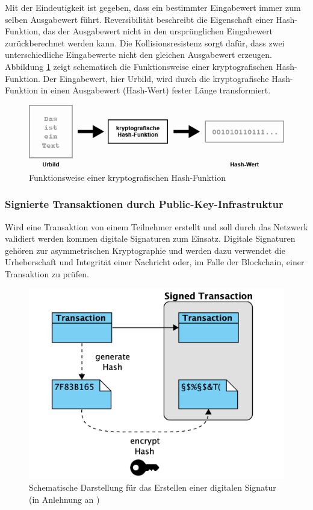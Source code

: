 Mit der Eindeutigkeit ist gegeben, dass ein bestimmter Eingabewert immer zum selben Ausgabewert führt. Reversibilität beschreibt die Eigenschaft einer Hash-Funktion, das der Ausgabewert nicht in den ursprünglichen Eingabewert zurückberechnet werden kann. Die Kollisionsresistenz sorgt dafür, dass zwei unterschiedliche Eingabewerte nicht den gleichen Ausgabewert erzeugen. Abbildung \ref{fig:schema-hash-function} zeigt schematisch die Funktionsweise einer kryptografischen Hash-Funktion. Der Eingabewert, hier Urbild, wird durch die kryptografische Hash-Funktion in einen Ausgabewert (Hash-Wert) fester Länge transformiert.

\begin{figure}[H]
	\centering
	\includegraphics[width=1.0\linewidth]{pictures/schema-hash-function}
	\caption[Funktionsweise einer kryptografischen Hash-Funktion]{Funktionsweise einer kryptografischen Hash-Funktion \citep{Schaerer2019}}
	\label{fig:schema-hash-function}
\end{figure}

\subsubsection{Signierte Transaktionen durch Public-Key-Infrastruktur}
Wird eine Transaktion von einem Teilnehmer erstellt und soll durch das Netzwerk validiert werden kommen digitale Signaturen zum Einsatz. Digitale Signaturen gehören zur asymmetrischen Kryptographie und werden dazu verwendet die Urheberschaft und Integrität einer Nachricht oder, im Falle der Blockchain, einer Transaktion zu prüfen.\citep{Beutelspacher2010, Menezes1997}

\begin{figure}[H]
	\centering
	\includegraphics[width=0.7\linewidth]{pictures/digital-signatures-create}
	\caption[Erstellen einer digitalen Signatur]{Schematische Darstellung für das Erstellen einer digitalen Signatur (in Anlehnung an \citet{Drescher2017})}
	\label{fig:digital-signatures-create}
\end{figure}


